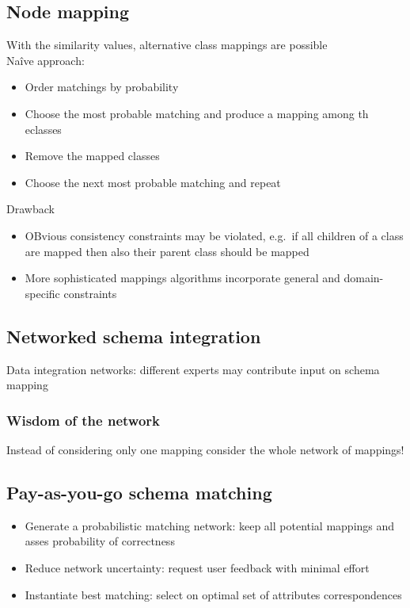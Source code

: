 \subsection{Node mapping}
With the similarity values, alternative class mappings are possible \\
Naîve approach:
\begin{itemize}
\item Order matchings by probability
\item Choose the most probable matching and produce a mapping among th
  eclasses
\item Remove the mapped classes
\item Choose the next most probable matching and repeat
\end{itemize}

Drawback
\begin{itemize}
\item OBvious consistency constraints may be violated, e.g.\, if all
  children of a class are mapped then also their parent class should
  be mapped
\item More sophisticated mappings algorithms incorporate general and
  domain-specific constraints
\end{itemize}


\subsection{Networked schema integration}

Data integration networks: different experts may contribute input on
schema mapping

\subsubsection{Wisdom of the network}
Instead of considering only one mapping consider the whole network of
mappings!

\subsection{Pay-as-you-go schema matching}
\begin{itemize}
\item Generate a probabilistic matching network: keep all potential
  mappings and asses probability of correctness
\item Reduce network uncertainty: request user feedback with minimal
  effort
\item Instantiate best matching: select on optimal set of attributes
  correspondences
\end{itemize}

